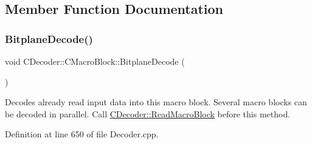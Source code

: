 \subsection{Member Function Documentation}
\mbox{\label{classCDecoder_1_1CMacroBlock_a72899e368b29833bd485c4858b5ad7ef}} 
\subsubsection{\texorpdfstring{BitplaneDecode()}{BitplaneDecode()}}
{\footnotesize\ttfamily void C\+Decoder\+::\+C\+Macro\+Block\+::\+Bitplane\+Decode (\begin{DoxyParamCaption}{ }\end{DoxyParamCaption})}

Decodes already read input data into this macro block. Several macro blocks can be decoded in parallel. Call \mbox{\hyperlink{classCDecoder_a55cbccabab76500fd47e15332d6b6506}{C\+Decoder\+::\+Read\+Macro\+Block}} before this method. 

Definition at line 650 of file Decoder.\+cpp.


